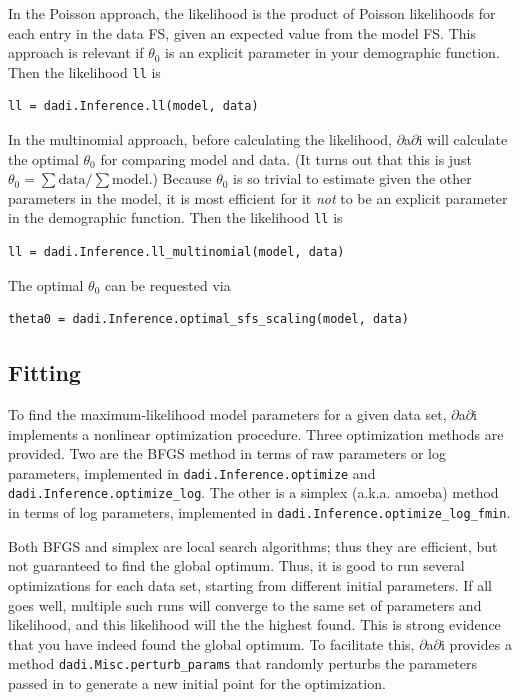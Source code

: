 \documentclass[12pt]{article}
\makeatletter
\newcommand{\dadi}{$\partial$a$\partial$i\xspace}
\newcommand{\py}[1]{\lstinline[language=Python, showstringspaces=False]@#1@}
\makeatother
\begin{document}
In the Poisson approach, the likelihood is the product of Poisson likelihoods for each entry in the data FS, given an expected value from the model FS.
This approach is relevant if $\theta_0$ is an explicit parameter in your demographic function.
Then the likelihood \py{ll} is
\begin{lstlisting}
ll = dadi.Inference.ll(model, data)
\end{lstlisting}

In the multinomial approach, before calculating the likelihood, \dadi will calculate the optimal $\theta_0$ for comparing model and data.
(It turns out that this is just $\theta_0 = \sum \text{data} / \sum \text{model}$.)
Because $\theta_0$ is so trivial to estimate given the other parameters in the model, it is most efficient for it \emph{not} to be an explicit parameter in the demographic function.
Then the likelihood \py{ll} is
\begin{lstlisting}
ll = dadi.Inference.ll_multinomial(model, data)
\end{lstlisting}
The optimal $\theta_0$ can be requested via
\begin{lstlisting}
theta0 = dadi.Inference.optimal_sfs_scaling(model, data)
\end{lstlisting}

\subsection{Fitting}

To find the maximum-likelihood model parameters for a given data set, \dadi implements a nonlinear optimization procedure.
Three optimization methods are provided.
Two are the BFGS method in terms of raw parameters or log parameters, implemented in \py{dadi.Inference.optimize} and \py{dadi.Inference.optimize_log}.
The other is a simplex (a.k.a. amoeba) method in terms of log parameters, implemented in \py{dadi.Inference.optimize_log_fmin}.

Both BFGS and simplex are local search algorithms; thus they are efficient, but not guaranteed to find the global optimum.
Thus, it is good to run several optimizations for each data set, starting from different initial parameters.
If all goes well, multiple such runs will converge to the same set of parameters and likelihood, and this likelihood will the the highest found.
This is strong evidence that you have indeed found the global optimum.
To facilitate this, \dadi provides a method \py{dadi.Misc.perturb_params} that randomly perturbs the parameters passed in to generate a new initial point for the optimization.
\end{document}
